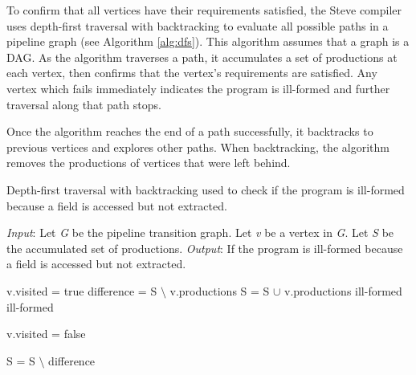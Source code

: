 
To confirm that all vertices have their requirements satisfied, the Steve compiler uses depth-first traversal with backtracking to evaluate all possible paths in a pipeline graph (see Algorithm \ref{alg:dfs}).
This algorithm assumes that a graph is a DAG.
As the algorithm traverses a path, it accumulates a set of productions at each vertex, then confirms that the vertex's requirements are satisfied. Any vertex which fails immediately indicates the program is ill-formed and further traversal along that path stops.


Once the algorithm reaches the end of a path successfully, it backtracks to previous
vertices and explores other paths. When backtracking, the algorithm removes the productions of vertices that were left behind.

\begin{algorithm}[ht]
 \caption{Depth-first traversal with backtracking used to check if the program is ill-formed because a field is accessed but not extracted.}
 \label{alg:dfs}
 \begin{algorithmic}
 \State
 \State \textit{Input}: Let \textit{G} be the pipeline transition graph. Let \textit{v} be a vertex in \textit{G}. Let \textit{S} be the accumulated set of productions.
 \State \textit{Output}: If the program is ill-formed because a field is accessed but not extracted.
 \State

 	\State v.visited = true
 	\State difference = S $\setminus$ v.productions
 	\State S = S $\cup$ v.productions
 				\State {}
 			\Else
 				\State \Return ill-formed
 			\EndIf
 		\EndFor
	\Else
 		\State \Return ill-formed
 	\EndIf


 	\State v.visited = false 

 	\State S = S $\setminus$ difference 
 \EndFunction
 \end{algorithmic}

\end{algorithm}

